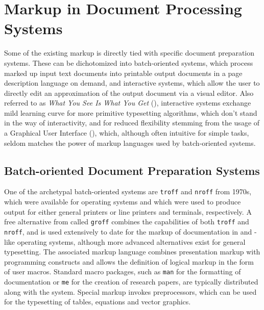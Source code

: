 \documentclass{book}
\begin{document}

        
      \section{Markup in Document Processing Systems}
        Some of the existing markup is directly tied with specific document
        preparation systems. These can be dichotomized into batch-oriented
        systems, which process marked up input text documents into printable
        output documents in a page description language on demand, and
        interactive systems, which allow the user to directly edit an
        approximation of the output document via a visual editor. Also referred
        to as \emph{What You See Is What You Get} (),
        interactive systems exchange mild learning curve for more primitive
        typesetting algorithms, which don't stand in the way of interactivity,
        and for reduced flexibility stemming from the usage of a Graphical User
        Interface (), which, although often intuitive for simple
        tasks, seldom matches the power of markup languages used by
        batch-oriented systems.

      \subsection{Batch-oriented Document Preparation Systems}
        One of the archetypal batch-oriented systems are \texttt{troff} and
        \texttt{nroff} from 1970s, which were available for 
        operating systems and which were used to produce output for either
        general printers or line printers and terminals, respectively. A free
        alternative from  called \texttt{groff} combines the
        capabilities of both \texttt{troff} and \texttt{nroff}, and is used
        extensively to date for the markup of documentation in 
        and -like operating systems, although more advanced
        alternatives exist for general typesetting. The associated markup
        language combines presentation markup with programming constructs and
        allows the definition of logical markup in the form of user macros.
        Standard macro packages, such as \texttt{man} for the formatting of
        documentation or \texttt{me} for the creation of research papers, are
        typically distributed along with the system. Special markup invokes
        preprocessors, which can be used for the typesetting of tables,
        equations and vector graphics.
\end{document}

